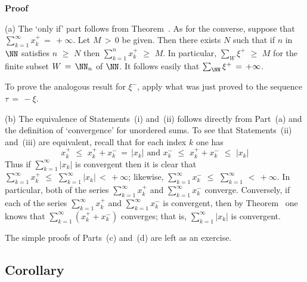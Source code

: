 \V

        {\bf Proof}

\V

        (a) The `only if' part follows from Theorem~. As for the converse, suppose that $\sum_{k=1}^{{\infty}} x_{k}^{+} \,=\, +{\infty}$.
    Let $M\,>\,0$ be given. Then there exists $N$ such that if $n$ in ${\NN}$ satisfies $n\,\,{\geq}\,\,N$ then $\sum_{k=1}^{n} x_{k}^{+}\,\,{\geq}\,\,M$.
    In particular, $\sum_{W} {\xi}^{+}\,\,{\geq}\,\,M$ for the finite subset $W \,=\, {\NN}_{n}$ of ${\NN}$.
    It follows easily that $\sum_{{\NN}} {\xi}^{+} \,=\, +{\infty}$.

        To prove the analogous result for ${\xi}^{-}$, apply what was just proved to the sequence ${\tau} \,=\, -{\xi}$.

\V

        (b) The equivalence of Statements~(i) and~(ii) follows directly from Part~(a) and the definition of `convergence' for unordered sums.
    To see that Statements~(ii) and~(iii) are equivalent, recall that for each index $k$ one has
        \begin{displaymath}
        x_{k}^{+}\,\,{\leq}\,\,x_{k}^{+} + x_{k}^{-} \,=\, |x_{k}| \mbox{ and }
        x_{k}^{-}\,\,{\leq}\,\,x_{k}^{+} + x_{k}^{-}\,\,{\leq}\,\,|x_{k}|
        \end{displaymath}
    Thus if $\sum_{k=1}^{{\infty}} |x_{k}|$ is convergent then it is clear that $\sum_{k=1}^{{\infty}} x_{k}^{+}\,\,{\leq}\,\,\sum_{k=1}^{{\infty}} |x_{k}|\,<\,+{\infty}$;
    likewise, $\sum_{k=1}^{{\infty}} x_{k}^{-}\,\,{\leq}\,\,\sum_{k=1}^{{\infty}}\,<\,+{\infty}$.
    In particular, both of the series $\sum_{k=1}^{{\infty}} x_{k}^{+}$ and $\sum_{k=1}^{{\infty}} x_{k}^{-}$ converge.
    Conversely, if each of the series $\sum_{k=1}^{{\infty}} x_{k}^{+}$ and $\sum_{k=1}^{{\infty}} x_{k}^{-}$ is convergent, then by Theorem~ one knows that $\sum_{k=1}^{{\infty}} (x_{k}^{+} + x_{k}^{-})$ converges;
    that is, $\sum_{k=1}^{{\infty}} |x_{k}|$ is convergent.

\V

        The simple proofs of Parts~(c) and~(d) are left as an exercise.

\V

        \subsection{\small{{\bf Corollary}}}
        \label{CorG40.30}

